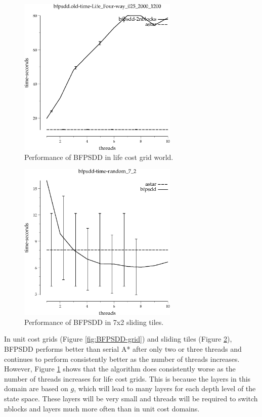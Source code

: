 \documentclass{article}
\begin{document}
\begin{figure}[h!]
\includegraphics[width=3in]{../graphs/seth/grid-life-single/BFPSDD.eps}
\caption{Performance of BFPSDD in life cost grid world.}
\label{fig:BFPSDD-life}
\end{figure}

\begin{figure}[h!]
\includegraphics[width=3in]{../graphs/seth/tiles-single/BFPSDD.eps}
\caption{Performance of BFPSDD in 7x2 sliding tiles.}
\label{fig:BFPSDD-tiles}
\end{figure}

In unit cost grids (Figure \ref{fig:BFPSDD-grid}) and sliding tiles (Figure \ref{fig:BFPSDD-tiles}), BFPSDD performs better than serial A* after only two or three threads and continues to perform consistently better as the number of threads increases. However, Figure \ref{fig:BFPSDD-life} shows that the algorithm does consistently worse as the number of threads increases for life cost grids. This is because the layers in this domain are based on $g$, which will lead to many layers for each depth level of the state space. These layers will be very small and threads will be required to switch nblocks and layers much more often than in unit cost domains.
\end{document}
